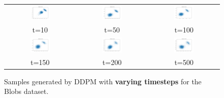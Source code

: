 \documentclass[11pt]{article}
\begin{document}
\begin{figure}[H]
    \centering
    \begin{tabular}{ccc}
        \includegraphics[width=0.3\textwidth]{exps/ddpm_2_10_0.0001_0.02_blobs/samples_10.png} &
        \includegraphics[width=0.3\textwidth]{exps/ddpm_2_50_0.0001_0.02_blobs/samples_50.png} &
        \includegraphics[width=0.3\textwidth]{exps/ddpm_2_100_0.0001_0.02_blobs/samples_100.png} \\
        t=10 & t=50 & t=100 \\[0.5em]
        
        \includegraphics[width=0.3\textwidth]{exps/ddpm_2_150_0.0001_0.02_blobs/samples_150.png} &
        \includegraphics[width=0.3\textwidth]{exps/ddpm_2_200_0.0001_0.02_blobs/samples_200.png} &
        \includegraphics[width=0.3\textwidth]{exps/ddpm_2_500_0.0001_0.02_blobs/samples_500.png} \\
        t=150 & t=200 & t=500 \\
    \end{tabular}
    \caption{Samples generated by DDPM with \textbf{varying timesteps} for the Blobs dataset.}
    \label{fig:timesteps_blobs}
\end{figure}
\end{document}
